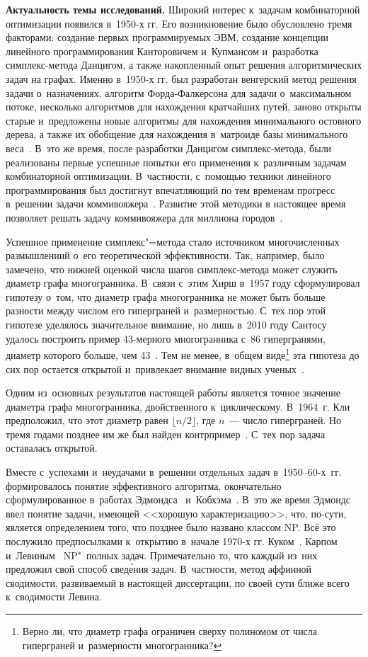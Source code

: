 \textbf{Актуальность темы исследований.}
Широкий интерес к~задачам комбинаторной оптимизации появился в~1950-х гг.
Его возникновение было обусловлено тремя факторами:
создание первых программируемых ЭВМ, создание концепции линейного программирования Канторовичем и~Купмансом и~разработка симплекс-метода Данцигом,
а также накопленный опыт решения алгоритмических задач на графах.
Именно в~1950-х гг. был разработан венгерский метод решения задачи о~назначениях,
алгоритм Форда-Фалкерсона для задачи о~максимальном потоке, 
несколько алгоритмов для нахождения кратчайших путей,
заново открыты старые и~предложены новые алгоритмы для нахождения минимального остовного дерева,
а также их обобщение для нахождения в~матроиде базы минимального веса~\cite{SchrijverHistory:2005}.
В~это же время, после разработки Данцигом симплекс-метода, были реализованы первые успешные попытки
его применения к~различным задачам комбинаторной оптимизации.
В~частности, с~помощью техники линейного программирования был достигнут впечатляющий по тем временам прогресс в~решении задачи коммивояжера~\cite{DantzigFJ:1954}.
Развитие этой методики в настоящее время позволяет решать задачу коммивояжера для миллиона городов~\cite{Applegate:2003}.

Успешное применение симплекс"=метода стало источником
многочисленных размышлениий о~его теоретической эффективности.
Так, например, было замечено, что нижней оценкой числа шагов симплекс-метода
может служить диаметр графа многогранника.
В~связи с~этим Хирш в~1957 году сформулировал гипотезу о~том,
что диаметр графа многогранника не может быть больше разности между числом его гиперграней и~размерностью.
С~тех пор этой гипотезе уделялось значительное внимание, но лишь в~2010 году Сантосу
удалось построить пример 43-мерного многогранника с~86 гипергранями, диаметр которого больше, чем 43~\cite{Santos:2012}.
Тем не менее, в~общем виде\footnote{Верно ли, что диаметр графа ограничен сверху полиномом от числа гиперграней и~размерности многогранника?} эта гипотеза до сих пор остается открытой и~привлекает внимание видных ученых~\cite{ZieglerHirsch:2012}.

Одним из~основных результатов настоящей работы является точное значение диаметра графа
многогранника, двойственного к~циклическому. 
В~1964~г. Кли~\cite{Klee:1964} предположил, что этот диаметр равен $\lfloor n/2\rfloor$,
где $n$~--- число гиперграней. Но тремя годами позднее им же был найден контрпример~\cite{Klee:1967}.
С~тех пор задача оставалась открытой.

Вместе с~успехами и~неудачами в~решении отдельных задач в~1950--60-х~гг.
формировалось понятие эффективного алгоритма, окончательно сформулированное в~работах 
Эдмондса~\cite{Edmonds:1965} и~Кобхэма~\cite{Cobham:1964}.
В~это же время Эдмондс~\cite{Edmonds:1965b} ввел понятие задачи, имеющей <<хорошую характеризацию>>,
что, по-сути, является определением того, что позднее было названо классом NP.
Всё это послужило предпосылками к~открытию в~начале 1970-х гг. Куком~\cite{Cook:1971}, Карпом~\cite{Karp:1972} и~Левиным~\cite{Levin:1973} NP"~полных задач. %
Примечательно то, что каждый из~них предложил свой способ свед\'{е}ния задач.
В~частности, метод аффинной сводимости, развиваемый в настоящей диссертации, по своей сути ближе всего к~сводимости Левина.

